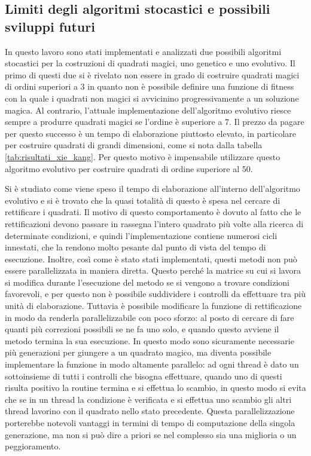 \documentclass[italian,twoside,twocolumn]{article}
\begin{document}
\subsection{Limiti degli algoritmi stocastici e possibili sviluppi futuri}
In questo lavoro sono stati implementati e analizzati due possibili algoritmi stocastici per la costruzioni di quadrati magici, uno genetico e uno evolutivo. Il primo di questi due si è rivelato non essere in grado di costruire quadrati magici di ordini superiori a 3 in quanto non è possibile definire una funzione di fitness con la quale i quadrati non magici si avvicinino progressivamente a un soluzione magica. 
Al contrario, l'attuale implementazione dell'algoritmo evolutivo riesce sempre a produrre quadrati magici se l'ordine è superiore a 7. Il prezzo da pagare per questo successo è un tempo di elaborazione piuttosto elevato, in particolare per costruire quadrati di grandi dimensioni, come si nota dalla tabella \ref{tab:risultati_xie_kang}. Per questo motivo è impensabile utilizzare questo algoritmo evolutivo per costruire quadrati di ordine superiore al 50. 

Si è studiato come viene speso il tempo di elaborazione all'interno dell'algoritmo evolutivo e si è trovato che la quasi totalità di questo è spesa nel cercare di rettificare i quadrati. Il motivo di questo comportamento è dovuto al fatto che le rettificazioni devono passare in rassegna l'intero quadrato più volte alla ricerca di determinate condizioni, e quindi l'implementazione contiene numerosi cicli innestati, che la rendono molto pesante dal punto di vista del tempo di esecuzione. Inoltre, così come è stato stati implementati, questi metodi non può essere parallelizzata in maniera diretta. Questo perché la matrice su cui si lavora si modifica durante l'esecuzione del metodo se si vengono a trovare condizioni favorevoli, e per questo non è possibile suddividere i controlli da effettuare tra più unità di elaborazione. Tuttavia è possibile modificare la funzione di rettificazione in modo da renderla parallelizzabile con poco sforzo: al posto di cercare di fare quanti più correzioni possibili se ne fa uno solo, e quando questo avviene il metodo termina la sua esecuzione. In questo modo sono sicuramente necessarie più generazioni per giungere a un quadrato magico, ma diventa possibile implementare la funzione in modo altamente parallelo: ad ogni thread è dato un sottoinsieme di tutti i controlli che bisogna effettuare, quando uno di questi risulta positivo la routine termina e si effettua lo scambio, in questo modo si evita che se in un thread la condizione è verificata e si effettua uno scambio gli altri thread lavorino con il quadrato nello stato precedente. Questa parallelizzazione porterebbe notevoli vantaggi in termini di tempo di computazione della singola generazione, ma non si può dire a priori se nel complesso sia una miglioria o un peggioramento. 
\end{document}
